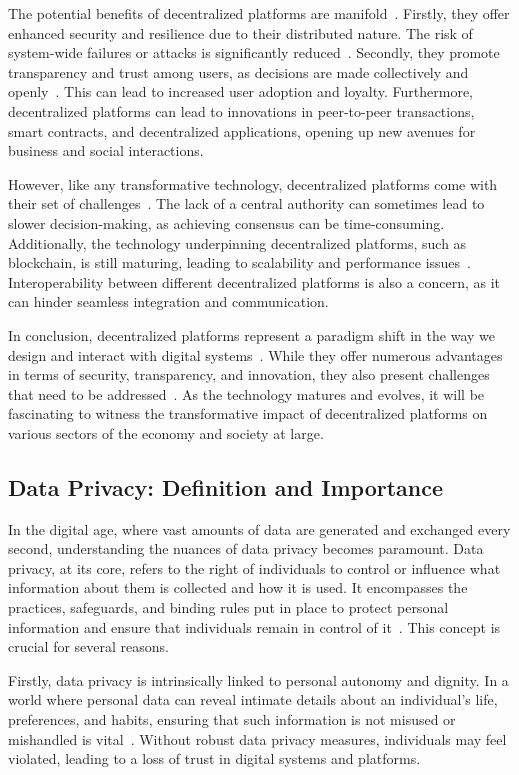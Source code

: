 The potential benefits of decentralized platforms are manifold~\cite{Hasan.2022}. Firstly, they offer enhanced security and resilience due to their distributed nature. The risk of system-wide failures or attacks is significantly reduced~\cite{Maffiola.2022}. Secondly, they promote transparency and trust among users, as decisions are made collectively and openly~\cite{Hasan.2022}. This can lead to increased user adoption and loyalty. Furthermore, decentralized platforms can lead to innovations in peer-to-peer transactions, smart contracts, and decentralized applications, opening up new avenues for business and social interactions.

However, like any transformative technology, decentralized platforms come with their set of challenges~\cite{Hasan.2022}. The lack of a central authority can sometimes lead to slower decision-making, as achieving consensus can be time-consuming. Additionally, the technology underpinning decentralized platforms, such as blockchain, is still maturing, leading to scalability and performance issues~\cite{Hasan.2022}. Interoperability between different decentralized platforms is also a concern, as it can hinder seamless integration and communication.

In conclusion, decentralized platforms represent a paradigm shift in the way we design and interact with digital systems~\cite{Tverdokhlib.2022}. While they offer numerous advantages in terms of security, transparency, and innovation, they also present challenges that need to be addressed~\cite{Hasan.2022}. As the technology matures and evolves, it will be fascinating to witness the transformative impact of decentralized platforms on various sectors of the economy and society at large.


\subsection{Data Privacy: Definition and Importance}
In the digital age, where vast amounts of data are generated and exchanged every second, understanding the nuances of data privacy becomes paramount. Data privacy, at its core, refers to the right of individuals to control or influence what information about them is collected and how it is used. It encompasses the practices, safeguards, and binding rules put in place to protect personal information and ensure that individuals remain in control of it~\cite{Covert.2020}. This concept is crucial for several reasons.

Firstly, data privacy is intrinsically linked to personal autonomy and dignity. In a world where personal data can reveal intimate details about an individual's life, preferences, and habits, ensuring that such information is not misused or mishandled is vital~\cite{Covert.2020}. Without robust data privacy measures, individuals may feel violated, leading to a loss of trust in digital systems and platforms.


